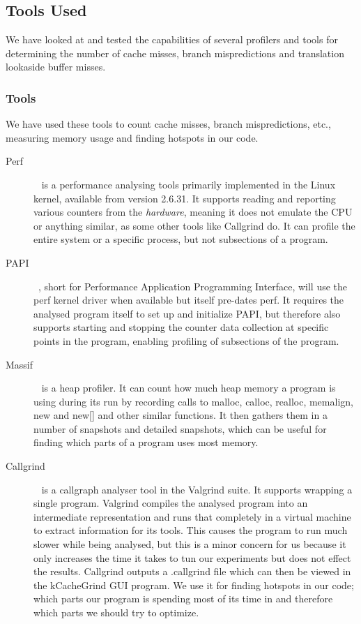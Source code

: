 \subsection{Tools Used}
We have looked at and tested the capabilities of several profilers and tools for determining the number of cache misses, branch mispredictions and translation lookaside buffer misses.


\subsubsection{Tools}
We have used these tools to count cache misses, branch mispredictions, etc., measuring memory usage and finding hotspots in our code.
\begin{description}
\item[Perf]~\citep{perftool} is a performance analysing tools primarily implemented in the Linux kernel, available from version 2.6.31.
It supports reading and reporting various counters from the \textit{hardware}, meaning it does not emulate the CPU or anything similar, as some other tools like Callgrind do.
It can profile the entire system or a specific process, but not subsections of a program.
\item[PAPI]~\citep{PAPI}, short for Performance Application Programming Interface, will use the perf kernel driver when available but itself pre-dates perf.
It requires the analysed program itself to set up and initialize PAPI, but therefore also supports starting and stopping the counter data collection at specific points in the program, enabling profiling of subsections of the program.
\item[Massif]~\citep{massif} is a heap profiler. It can count how much heap memory a program is using during its run by recording calls to malloc, calloc, realloc, memalign, new and new[] and other similar functions.
It then gathers them in a number of snapshots and detailed snapshots, which can be useful for finding which parts of a program uses most memory.
\item[Callgrind]~\citep{callgrind} is a callgraph analyser tool in the Valgrind suite.
It supports wrapping a single program.
Valgrind compiles the analysed program into an intermediate representation and runs that completely in a virtual machine to extract information for its tools.
This causes the program to run much slower while being analysed, but this is a minor concern for us because it only increases the time it takes to tun our experiments but does not effect the results.
Callgrind outputs a .callgrind file which can then be viewed in the kCacheGrind GUI program.
We use it for finding hotspots in our code; which parts our program is spending most of its time in and therefore which parts we should try to optimize.
\end{description}

